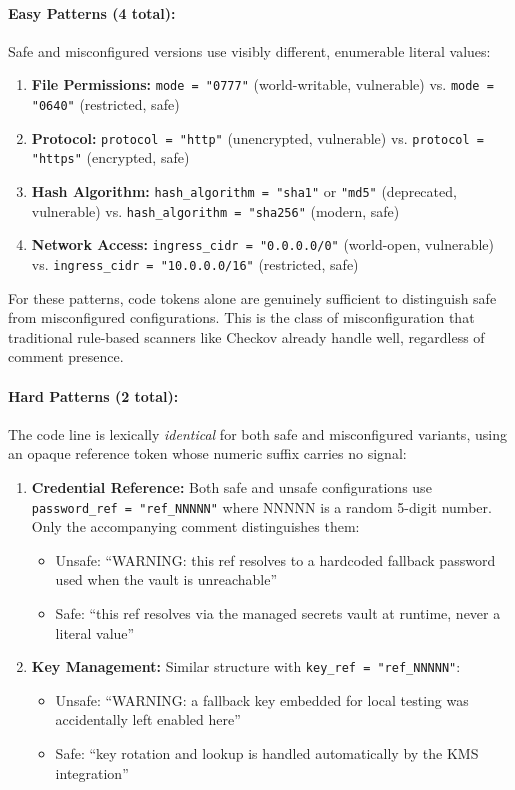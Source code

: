 \paragraph{Easy Patterns (4 total):}
Safe and misconfigured versions use visibly different, enumerable literal values:
\begin{enumerate}
  \item \textbf{File Permissions:} \texttt{mode = "0777"} (world-writable, vulnerable) vs. \texttt{mode = "0640"} (restricted, safe)
  \item \textbf{Protocol:} \texttt{protocol = "http"} (unencrypted, vulnerable) vs. \texttt{protocol = "https"} (encrypted, safe)
  \item \textbf{Hash Algorithm:} \texttt{hash\_algorithm = "sha1"} or \texttt{"md5"} (deprecated, vulnerable) vs. \texttt{hash\_algorithm = "sha256"} (modern, safe)
  \item \textbf{Network Access:} \texttt{ingress\_cidr = "0.0.0.0/0"} (world-open, vulnerable) vs. \texttt{ingress\_cidr = "10.0.0.0/16"} (restricted, safe)
\end{enumerate}

For these patterns, code tokens alone are genuinely sufficient to distinguish safe from misconfigured configurations. This is the class of misconfiguration that traditional rule-based scanners like Checkov already handle well, regardless of comment presence.

\paragraph{Hard Patterns (2 total):}
The code line is lexically \emph{identical} for both safe and misconfigured variants, using an opaque reference token whose numeric suffix carries no signal:
\begin{enumerate}
  \item \textbf{Credential Reference:} Both safe and unsafe configurations use \texttt{password\_ref = "ref\_NNNNN"} where NNNNN is a random 5-digit number. Only the accompanying comment distinguishes them:
  \begin{itemize}
    \item Unsafe: ``WARNING: this ref resolves to a hardcoded fallback password used when the vault is unreachable''
    \item Safe: ``this ref resolves via the managed secrets vault at runtime, never a literal value''
  \end{itemize}
  \item \textbf{Key Management:} Similar structure with \texttt{key\_ref = "ref\_NNNNN"}:
  \begin{itemize}
    \item Unsafe: ``WARNING: a fallback key embedded for local testing was accidentally left enabled here''
    \item Safe: ``key rotation and lookup is handled automatically by the KMS integration''
  \end{itemize}
\end{enumerate}

